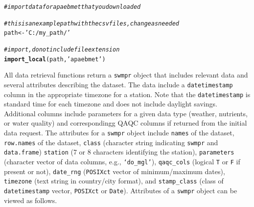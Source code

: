 \documentclass[10pt,letterpaper]{article}\usepackage[]{graphicx}\usepackage[]{color}
\makeatletter
\newcommand{\hlstr}[1]{\textcolor[rgb]{0.192,0.494,0.8}{#1}}%
\newcommand{\hlcom}[1]{\textcolor[rgb]{0.678,0.584,0.686}{\textit{#1}}}%
\newcommand{\hlstd}[1]{\textcolor[rgb]{0.345,0.345,0.345}{#1}}%
\newcommand{\hlkwb}[1]{\textcolor[rgb]{0.69,0.353,0.396}{#1}}%
\newcommand{\hlkwd}[1]{\textcolor[rgb]{0.737,0.353,0.396}{\textbf{#1}}}%
\newenvironment{kframe}{%
 \def\at@end@of@kframe{}%
 \ifinner\ifhmode%
  \def\at@end@of@kframe{\end{minipage}}%
  \begin{minipage}{\columnwidth}%
 \fi\fi%
 \def\FrameCommand##1{\hskip\@totalleftmargin \hskip-\fboxsep
 \colorbox{shadecolor}{##1}\hskip-\fboxsep
     \hskip-\linewidth \hskip-\@totalleftmargin \hskip\columnwidth}%
 \MakeFramed {\advance\hsize-\width
   \@totalleftmargin\z@ \linewidth\hsize
   \@setminipage}}%
 {\par\unskip\endMakeFramed%
 \at@end@of@kframe}
\newenvironment{knitrout}{}{} %
\makeatother
\begin{document}
\begin{knitrout}
\color{fgcolor}\begin{kframe}
\begin{alltt}
\hlcom{# import data for apaebmet that you downloaded}

\hlcom{# this is an example path with the csv files, change as needed}
\hlstd{path} \hlkwb{<-} \hlstr{'C:/my_path/'}

\hlcom{# import, do not include file extension}
\hlkwd{import_local}\hlstd{(path,} \hlstr{'apaebmet'}\hlstd{)}
\end{alltt}
\end{kframe}
\end{knitrout}

All data retrieval functions return a \texttt{swmpr} object that includes relevant data and several attributes describing the dataset.  The data include a \texttt{datetimestamp} column in the appropriate timezone for a station.  Note that the \texttt{datetimestamp} is standard time for each timezone and does not include daylight savings. Additional columns include parameters for a given data type (weather, nutrients, or water quality) and correspondingg \ac{QAQC} columns if returned from the initial data request.  The attributes for a \texttt{swmpr} object include \texttt{names} of the dataset, \texttt{row.names} of the dataset, \texttt{class} (character string indicating \texttt{swmpr} and \texttt{data.frame}) \texttt{station} (7 or 8 characters identifying the station),  \texttt{parameters} (character vector of data columns, e.g., \texttt{`do\_mgl'}), \texttt{qaqc\_cols} (logical \texttt{T} or \texttt{F} if present or not), \texttt{date\_rng} (\texttt{POSIXct} vector of minimum/maximum dates), \texttt{timezone} (text string in country/city format), and \texttt{stamp\_class} (class of \texttt{datetimestamp} vector, \texttt{POSIXct} or \texttt{Date}).  Attributes of a \texttt{swmpr} object can be viewed as follows.
\end{document}
